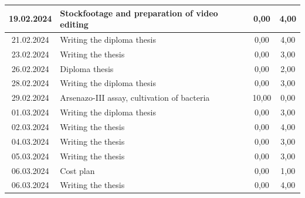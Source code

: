 \begin{longtable}{|c|p{7cm}|c|c|}
    19.02.2024    & Stockfootage and preparation of video editing                                                                   & 0,00                 & 4,00              \\ \hline
    21.02.2024    & Writing the diploma thesis                                                                                      & 0,00                 & 4,00              \\ \hline
    23.02.2024    & Writing the thesis                                                                                              & 0,00                 & 3,00              \\ \hline
    26.02.2024    & Diploma thesis                                                                                                  & 0,00                 & 2,00              \\ \hline
    28.02.2024    & Writing the diploma thesis                                                                                      & 0,00                 & 3,00              \\ \hline
    29.02.2024    & Arsenazo-III assay, cultivation of bacteria                                                                     & 10,00                & 0,00              \\ \hline
    01.03.2024    & Writing the diploma thesis                                                                                      & 0,00                 & 3,00              \\ \hline
    02.03.2024    & Writing the thesis                                                                                              & 0,00                 & 4,00              \\ \hline
    04.03.2024    & Writing the thesis                                                                                              & 0,00                 & 3,00              \\ \hline
    05.03.2024    & Writing the thesis                                                                                              & 0,00                 & 3,00              \\ \hline
    06.03.2024    & Cost plan                                                                                                       & 0,00                 & 1,00              \\ \hline
    06.03.2024    & Writing the thesis                                                                                              & 0,00                 & 4,00              \\ \hline

\end{longtable}

